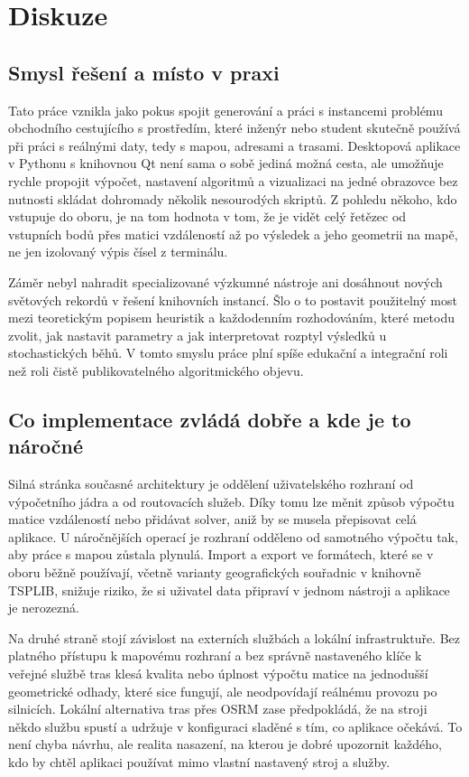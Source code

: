 \chapter{Diskuze}

\section{Smysl řešení a místo v praxi}

Tato práce vznikla jako pokus spojit generování a práci s instancemi problému obchodního cestujícího s prostředím, které inženýr nebo student skutečně používá při práci s reálnými daty, tedy s mapou, adresami a trasami. Desktopová aplikace v Pythonu s knihovnou Qt není sama o sobě jediná možná cesta, ale umožňuje rychle propojit výpočet, nastavení algoritmů a vizualizaci na jedné obrazovce bez nutnosti skládat dohromady několik nesourodých skriptů. Z pohledu někoho, kdo vstupuje do oboru, je na tom hodnota v tom, že je vidět celý řetězec od vstupních bodů přes matici vzdáleností až po výsledek a jeho geometrii na mapě, ne jen izolovaný výpis čísel z terminálu.

Záměr nebyl nahradit specializované výzkumné nástroje ani dosáhnout nových světových rekordů v řešení knihovních instancí. Šlo o to postavit použitelný most mezi teoretickým popisem heuristik a každodenním rozhodováním, které metodu zvolit, jak nastavit parametry a jak interpretovat rozptyl výsledků u stochastických běhů. V tomto smyslu práce plní spíše edukační a integrační roli než roli čistě publikovatelného algoritmického objevu.

\section{Co implementace zvládá dobře a kde je to náročné}

Silná stránka současné architektury je oddělení uživatelského rozhraní od výpočetního jádra a od routovacích služeb. Díky tomu lze měnit způsob výpočtu matice vzdáleností nebo přidávat solver, aniž by se musela přepisovat celá aplikace. U náročnějších operací je rozhraní odděleno od samotného výpočtu tak, aby práce s mapou zůstala plynulá. Import a export ve formátech, které se v oboru běžně používají, včetně varianty geografických souřadnic v knihovně TSPLIB, snižuje riziko, že si uživatel data připraví v jednom nástroji a aplikace je nerozezná.

Na druhé straně stojí závislost na externích službách a lokální infrastruktuře. Bez platného přístupu k mapovému rozhraní a bez správně nastaveného klíče k veřejné službě tras klesá kvalita nebo úplnost výpočtu matice na jednodušší geometrické odhady, které sice fungují, ale neodpovídají reálnému provozu po silnicích. Lokální alternativa tras přes OSRM zase předpokládá, že na stroji někdo službu spustí a udržuje v konfiguraci sladěné s tím, co aplikace očekává. To není chyba návrhu, ale realita nasazení, na kterou je dobré upozornit každého, kdo by chtěl aplikaci používat mimo vlastní nastavený stroj a služby.

